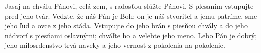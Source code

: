 Jasaj na chválu Pánovi, celá zem,
s radosťou slúžte Pánovi.
\versseparator
S plesaním vstupujte pred jeho tvár.
\versseparator
Vedzte, že náš Pán je Boh;
on je náš stvoriteľ a jemu patríme,
\versseparator
sme jeho ľud a ovce z jeho stáda.
Vstupujte do jeho brán s piesňou chvály
a do jeho nádvorí s piesňami oslavnými;
\versseparator
chváľte ho a velebte jeho meno.
Lebo Pán je dobrý;
jeho milosrdenstvo trvá naveky
a jeho vernosť z pokolenia na pokolenie.